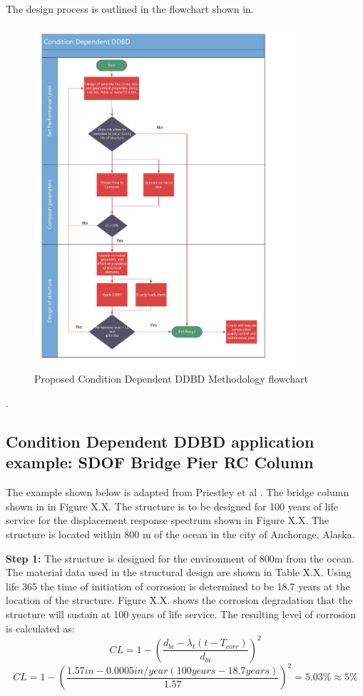 The design process is outlined in the flowchart shown in.

\begin{figure}[htbp]
	\centering
	\includegraphics[width=0.875\textwidth]{VAC Thesis 2.0/Chapter-6/figs/CD_DDBD_VictorCalderon.pdf}
	\caption{Proposed Condition Dependent DDBD Methodology flowchart}
	\label{fig:CD-DDBD_CH6}
\end{figure}. 

\subsection{Condition Dependent DDBD application example: SDOF Bridge Pier RC Column}

The example shown below is adapted from Priestley et al \cites{Priestley2007}. The bridge column shown in in Figure X.X. The structure is to be designed for 100 years of life service for the displacement response spectrum shown in Figure X.X. The structure is located within 800 m of the ocean in the city of Anchorage, Alaska.

\textbf{Step 1:} The structure is designed for the environment of 800m from the ocean. The material data used in the structural design are shown in Table X.X. Using life 365 the time of initiation of corrosion is determined to be 18.7 years at the location of the structure. Figure X.X. shows the corrosion degradation that the structure will sustain at 100 years of life service. The resulting level of corrosion is calculated as:
\begin{displaymath}
    CL=1-\left(\frac{d_{bi}-\lambda_{t}(t-T_{corr})}{d_{bi}}\right)^2
\end{displaymath}
\begin{displaymath}
    CL= 1-\left(\frac{1.57 in -0.0005 in/year (100 years -18.7 years)}{1.57}\right)^2=5.03\% \approx 5\%
\end{displaymath}

